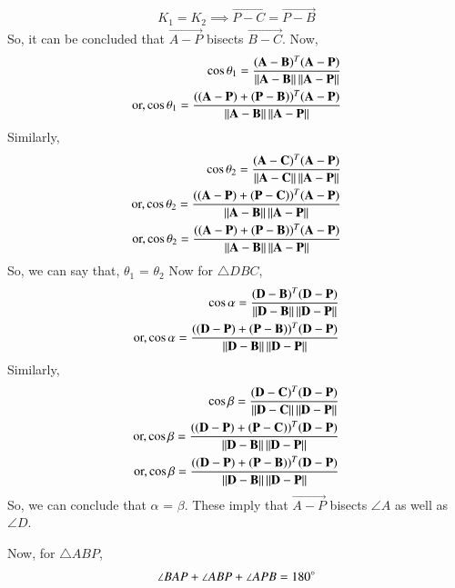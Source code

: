 \documentclass[journal,12pt,twocolumn]{IEEEtran}
\begin{document}
\begin{align}
K_1 = K_2
\implies \vec{P-C} = \vec{P-B}
\end{align}
So, it can be concluded that $\vec{A-P}$ bisects $\vec{B-C}$.
Now, 
\begin{align}
\cos\theta_1 = \frac{(\mathbf{A-B})^T (\mathbf{A-P})}{\left\lVert\mathbf{A-B}\right\rVert\left\lVert\mathbf{A-P}\right\rVert}\\
\text{or,}\cos\theta_1  = \frac{((\mathbf{A-P})+(\mathbf{P-B}))^T (\mathbf{A-P})}{\left\lVert\mathbf{A-B}\right\rVert\left\lVert\mathbf{A-P}\right\rVert}
\end{align}
Similarly,
\begin{align}
\cos\theta_2 = \frac{(\mathbf{A-C})^T (\mathbf{A-P})}{\left\lVert\mathbf{A-C}\right\rVert\left\lVert\mathbf{A-P}\right\rVert}\\
\text{or,}\cos\theta_2  = \frac{((\mathbf{A-P})+(\mathbf{P-C}))^T (\mathbf{A-P})}{\left\lVert\mathbf{A-B}\right\rVert\left\lVert\mathbf{A-P}\right\rVert}\\
\text{or,}\cos\theta_2  = \frac{((\mathbf{A-P})+(\mathbf{P-B}))^T (\mathbf{A-P})}{\left\lVert\mathbf{A-B}\right\rVert\left\lVert\mathbf{A-P}\right\rVert}
\end{align}
So, we can say that, $\theta_1$ = $\theta_2$
Now for $\triangle DBC$,
\begin{align}
\cos\alpha = \frac{(\mathbf{D-B})^T (\mathbf{D-P})}{\left\lVert\mathbf{D-B}\right\rVert\left\lVert\mathbf{D-P}\right\rVert}\\
\text{or,}\cos\alpha  = \frac{((\mathbf{D-P})+(\mathbf{P-B}))^T (\mathbf{D-P})}{\left\lVert\mathbf{D-B}\right\rVert\left\lVert\mathbf{D-P}\right\rVert}
\end{align}
Similarly,
\begin{align}
\cos\beta = \frac{(\mathbf{D-C})^T (\mathbf{D-P})}{\left\lVert\mathbf{D-C}\right\rVert\left\lVert\mathbf{D-P}\right\rVert}\\
\text{or,}\cos\beta = \frac{((\mathbf{D-P})+(\mathbf{P-C}))^T (\mathbf{D-P})}{\left\lVert\mathbf{D-B}\right\rVert\left\lVert\mathbf{D-P}\right\rVert}\\
\text{or,}\cos\beta  = \frac{((\mathbf{D-P})+(\mathbf{P-B}))^T (\mathbf{D-P})}{\left\lVert\mathbf{D-B}\right\rVert\left\lVert\mathbf{D-P}\right\rVert}
\end{align}
So, we can conclude that $\alpha$ = $\beta$.
These imply that $\vec{A-P}$ bisects $\angle A$ as well as $\angle D$.

Now, for $\triangle ABP$,
\begin{align}
\angle BAP + \angle ABP + \angle APB = 180 \degree
\end{align}
\end{document}
